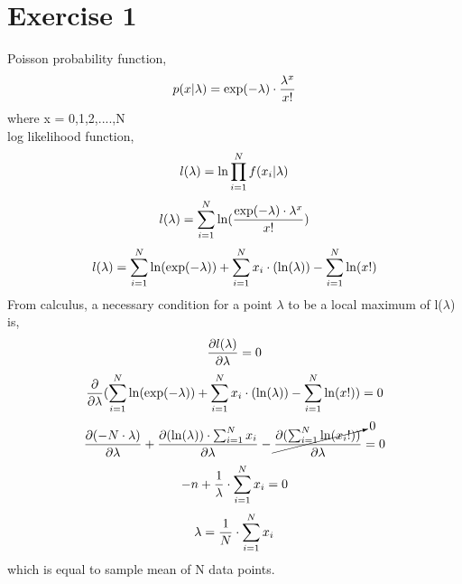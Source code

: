 \documentclass{article}
\numberwithin{equation}{section}
\begin{document}
\section{Exercise 1 }

Poisson probability function, \\
\begin{equation}\label{eq1}
p(x|\lambda) = \exp(-\lambda) \cdot \frac{\lambda^x}{x!}\\
\end{equation}
where x = 0,1,2,....,N \\
log likelihood function, \\
\begin{equation}\label{eq2}
l(\lambda) = \ln \prod_{i=1}^{N}f(x_i|\lambda) \\
\end{equation}
\begin{equation}\label{eq3}
l(\lambda) = \sum_{i=1}^{N} \ln(\frac{\exp(-\lambda) \cdot \lambda^x}{x!})\\
\end{equation}
\begin{equation}\label{eq4}
l(\lambda) = \sum_{i=1}^{N} \ln(\exp(-\lambda)) + \sum_{i=1}^{N} x_i \cdot (\ln(\lambda)) - \sum_{i=1}^{N} \ln(x!) \\
\end{equation}
From calculus, a necessary condition for a point $\lambda$ to be a local maximum of l($\lambda$) is,\\
\begin{equation}\label{eq5}
\frac{\partial l(\lambda)}{\partial \lambda} = 0\\
\end{equation}
\begin{equation}\label{eq6}
\frac{\partial}{\partial \lambda} (\sum_{i=1}^{N} \ln(\exp(-\lambda)) + \sum_{i=1}^{N} x_i \cdot (\ln(\lambda)) - \sum_{i=1}^{N} \ln(x!)) = 0\\
\end{equation}
\begin{equation}\label{eq7}
\frac{\partial (-N\cdot \lambda)}{\partial \lambda} + \frac{\partial (\ln (\lambda))\cdot \sum_{i=1}^{N} x_i}{\partial \lambda} - \cancelto{0}{\frac{\partial (\sum_{i=1}^{N} \ln (x_i!))}{\partial \lambda}} = 0 \\
\end{equation}
\begin{equation}\label{eq8}
-n + \frac{1}{\lambda}\cdot \sum_{i=1}^{N} x_i = 0 \\
\end{equation}
\begin{equation}\label{eq9}
\lambda = \frac{1}{N} \cdot \sum_{i=1}^{N} x_i  \\
\end{equation}
which is equal to sample mean of N data points.\\
\end{document}
